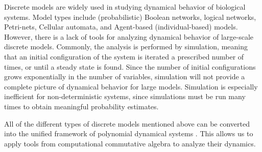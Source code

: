 \documentclass[11pt]{amsart}
\begin{document}

Discrete models are widely used in studying dynamical behavior of biological systems. Model types include
(probabilistic) Boolean networks, logical networks, Petri-nets, Cellular
automata, and Agent-based (individual-based) models. 
However, there is a lack of tools
for analyzing dynamical behavior of large-scale discrete models. Commonly, the analysis is performed by simulation, meaning that an
initial configuration of the system is iterated a prescribed number of times, or until a
steady state is found. Since the number of initial configurations grows exponentially in the number of variables, simulation
will not provide a complete picture of dynamical behavior for large models.
Simulation is especially inefficient for non-deterministic
systems, since simulations must be run many times to obtain meaningful
probability estimates.

All of the different types of discrete models mentioned above can be
converted into the unified framework of polynomial dynamical systems
\cite{Alan:Bioinf2010, Hinkelmann:2010}. This allows us to apply tools from
computational commutative algebra to analyze their dynamics. 

\end{document}
